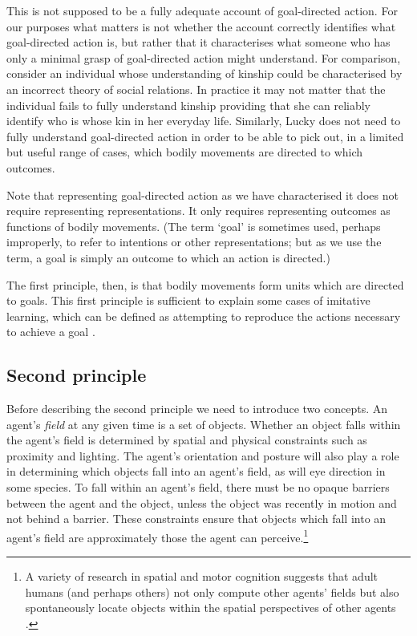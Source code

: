 \documentclass[12pt,\papersize]{extarticle}
\begin{document}
This is not supposed to be a fully adequate account of goal-directed action.
For our purposes what matters  is not whether the account correctly identifies what goal-directed action is, but rather that it characterises what someone who has only a minimal grasp of goal-directed action might understand.  
For comparison, consider an individual whose understanding of kinship could be characterised by an incorrect theory of social relations.
In practice it may not matter that the individual fails to fully understand kinship providing that she can reliably identify who is whose kin in her everyday life.  
Similarly, Lucky does not need to fully understand goal-directed action in order to be able to pick out, in a limited but useful range of cases, which bodily movements are directed to which outcomes.

Note that representing goal-directed action as we have characterised it does not require representing representations.
It only requires representing outcomes as functions of bodily movements. 
(The term `goal' is sometimes used, perhaps improperly, to refer to intentions or other representations;
but as we use the term, a goal is simply an outcome to which an action is directed.)


The first principle, then, is that bodily movements form units which are directed to goals.  This first principle is sufficient to explain some cases of imitative learning, which can be defined as attempting to reproduce the actions necessary to achieve a goal \citep[]{en_1317}.  



\subsection{Second principle}
Before describing the second principle we need to introduce two concepts.
An agent’s \textit{field} at any given time is a set of objects.  Whether an object falls within the agent’s field is determined by spatial and physical constraints such as proximity and lighting.  The agent’s orientation and posture will also play a role in determining which objects fall into an agent’s field, as will eye direction in some species.  To fall within an agent’s field, there must be no opaque barriers between the agent and the object, unless the object was recently in motion and not behind a barrier.  These constraints ensure that objects which fall into an agent’s field are approximately those the agent can perceive.\footnote{ 	A variety of research in spatial and motor cognition suggests that adult humans (and perhaps others) not only compute other agents’ fields but also spontaneously locate objects within the spatial perspectives of other agents \citep[e.g.][]{en_1700, en_1701}.  }
\end{document}
